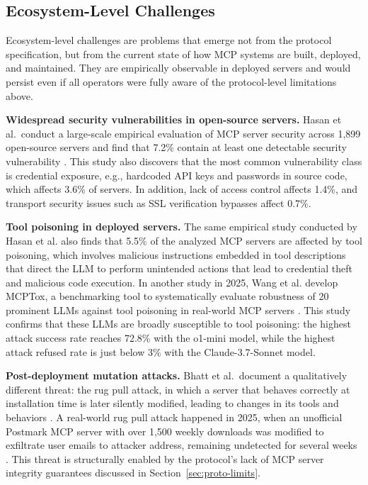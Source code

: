 \documentclass[english, 12pt, a4paper, elec, utf8, a-2b, online]{aaltothesis}
\begin{document}
\subsection{Ecosystem-Level Challenges}
\label{sec:ecosystem-challenges}

Ecosystem-level challenges are problems that emerge not from the protocol specification, but from the current state of
how MCP systems are built, deployed, and maintained.
They are empirically observable in deployed servers and would persist even if all operators were fully aware of the protocol-level limitations above.

\textbf{Widespread security vulnerabilities in open-source servers.}
Hasan et al.\ conduct a large-scale empirical evaluation of MCP server security across 1,899 open-source servers and find that 7.2\% contain at least one detectable security vulnerability \cite{hasan2025mcp}.
This study also discovers that the most common vulnerability class is credential exposure, e.g., hardcoded API keys and passwords in source code, which affects 3.6\% of servers.
In addition, lack of access control affects 1.4\%, and transport security issues such as SSL verification bypasses affect 0.7\%.

\textbf{Tool poisoning in deployed servers.}
The same empirical study conducted by Hasan et al. \cite{hasan2025mcp} also finds that 5.5\% of the analyzed MCP servers are affected by tool poisoning, which involves malicious instructions embedded in tool descriptions that direct the LLM to perform unintended actions that lead to credential theft and malicious code execution. 
In another study in 2025, Wang et al. develop MCPTox, a benchmarking tool to systematically evaluate robustness of 20 prominent LLMs against tool poisoning in real-world MCP servers \cite{wang2026mcptox}.
This study confirms that these LLMs are broadly susceptible to tool poisoning: the highest attack success rate reaches 72.8\% with the o1-mini model, while the highest attack refused rate is just below 3\% with the Claude-3.7-Sonnet model.

\textbf{Post-deployment mutation attacks.}
Bhatt et al.\ document a qualitatively different threat: the rug pull attack, in which a server that behaves correctly at installation time is later silently modified, leading to changes in its tools and behaviors \cite{bhatt2025etdi}.
A real-world rug pull attack happened in 2025, when an unofficial Postmark MCP server with over 1,500 weekly downloads was modified to exfiltrate user emails to attacker address, remaining undetected for several weeks \cite{postmark2025incident}.
This threat is structurally enabled by the protocol's lack of MCP server integrity guarantees discussed in Section~\ref{sec:proto-limits}.
\end{document}
